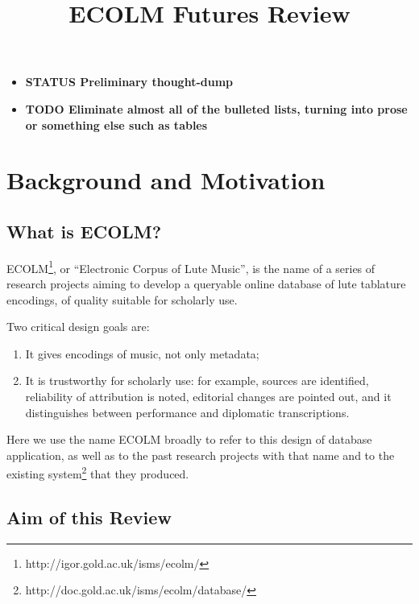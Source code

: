 \documentclass[sigconf]{acmart}
\begin{document}
\title{ECOLM Futures Review}

\maketitle
\begin{sloppypar}
  

  \begin{itemize}
    \item {\bf STATUS Preliminary thought-dump}
    \item {\bf TODO Eliminate almost all of the bulleted lists, turning into
      prose or something else such as tables}
  \end{itemize}
  
  \section{Background and Motivation}

  \subsection{What is ECOLM?}

  ECOLM\footnote{http://igor.gold.ac.uk/isms/ecolm/}, or ``Electronic
  Corpus of Lute Music'', is the name of a series of research projects
  aiming to develop a queryable online database of lute tablature
  encodings, of quality suitable for scholarly use.

  Two critical design goals are:
  
  \begin{enumerate}
  \item It gives encodings of music, not only metadata;
  \item It is trustworthy for scholarly use: for example, sources are
    identified, reliability of attribution is noted, editorial changes
    are pointed out, and it distinguishes between performance and
    diplomatic transcriptions.
  \end{enumerate}
  
  Here we use the name ECOLM broadly to refer to this design of
  database application, as well as to the past research projects with
  that name and to the existing
  system\footnote{http://doc.gold.ac.uk/isms/ecolm/database/} that
  they produced.

  \subsection{Aim of this Review}


\end{sloppypar}
\end{document}
